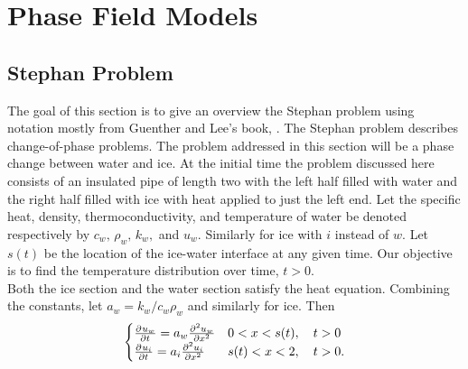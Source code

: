 
\chapter{Phase Field Models} %

\label{Chapter4} %


\section{Stephan Problem}

The goal of this section is to give an overview the Stephan problem using notation mostly from Guenther and Lee's book, \parencite{GuetherandLee}. The Stephan problem describes change-of-phase problems. The problem addressed in this section will be a phase change between water and ice. At the initial time the problem discussed here consists of an insulated pipe of length two with the left half filled with water and the right half filled with ice with heat applied to just the left end. Let the specific heat, density, thermoconductivity, and temperature of water be denoted respectively by $c_w, \, \rho_w, \,  k_w,$ and $u_w$. Similarly for ice with $i$ instead of $w$. Let $s(t)$ be the location of the ice-water interface at any given time. Our objective is to find the temperature distribution over time, $t>0$. \\
Both the ice section and the water section satisfy the heat equation. Combining the constants, let $a_w=k_w/c_w \rho_w$ and similarly for ice. Then
\begin{eqnarray} \begin{cases} 
\frac{\partial^{} u_w}{\partial {t}^{}}=a_w \frac{\partial^{2} u_w}{\partial {x}^{2}}  & 0< x < s(t), \quad t>0 \\
\frac{\partial^{} u_i}{\partial {t}^{}}=a_i \frac{\partial^{2} u_i}{\partial {x}^{2}}  & s(t) <x <2, \quad t>0. \label{mainstefanpde}
\end{cases}
\end{eqnarray}

